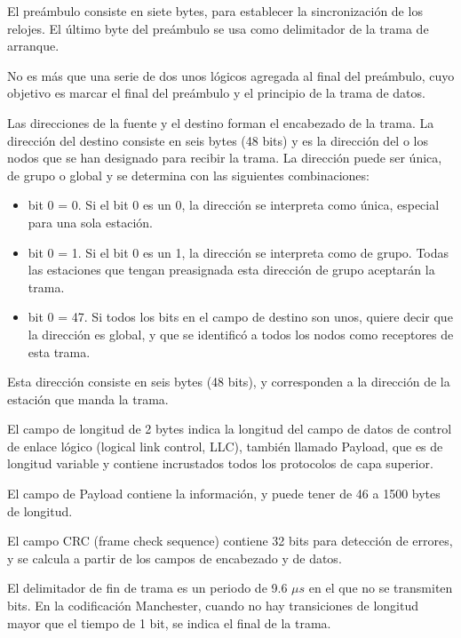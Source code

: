 \documentclass[../principal]{subfiles}
\begin{document}
  \begin{description}[align=left]
    \item[Preámbulo:] El preámbulo consiste en siete bytes, para establecer la sincronización de los relojes. El último byte del preámbulo se usa como delimitador de la trama de arranque.
    \item[Delimitador de la trama de arranque:] No es más que una serie de dos unos lógicos agregada al final del preámbulo, cuyo objetivo es marcar el final del preámbulo y el principio de la trama de datos.
    \item[Dirección de destino:] Las direcciones de la fuente y el destino forman el encabezado de la trama. La dirección del destino consiste en seis bytes (48 bits) y es la dirección del o los nodos que se han designado para recibir la trama. La dirección puede ser única, de grupo o global y se determina con las siguientes combinaciones:
    \begin{itemize}
      \item bit 0 = 0. Si el bit 0 es un 0, la dirección se interpreta como única, especial para una sola estación.
      \item bit 0 = 1. Si el bit 0 es un 1, la dirección se interpreta como de grupo. Todas las estaciones que tengan preasignada esta dirección de grupo aceptarán la trama.
      \item bit 0 = 47. Si todos los bits en el campo de destino son unos, quiere decir que la dirección es global, y que se identificó a todos los nodos como receptores de esta trama.
    \end{itemize}
    \item[Dirección de fuente:] Esta dirección consiste en seis bytes (48 bits), y corresponden a la dirección de la estación que manda la trama.
    \item[Campo de longitud:] El campo de longitud de 2 bytes indica la longitud del campo de datos de control de enlace lógico (logical link control, LLC), también llamado Payload, que es de longitud variable y contiene incrustados todos los protocolos de capa superior.
    \item[Payload:] El campo de Payload contiene la información, y puede tener de 46 a 1500 bytes de longitud.
    \item[Campo de secuencia de verificación de trama:] El campo CRC (frame check sequence) contiene 32 bits para detección de errores, y se calcula a partir de los campos de encabezado y de datos.
    \item[Delimitador de fin de trama:] El delimitador de fin de trama es un periodo de 9.6 $ \mu s $ en el que no se transmiten bits. En la codificación Manchester, cuando no hay transiciones de longitud mayor que el tiempo de 1 bit, se indica el final de la trama.
  \end{description}
\end{document}
